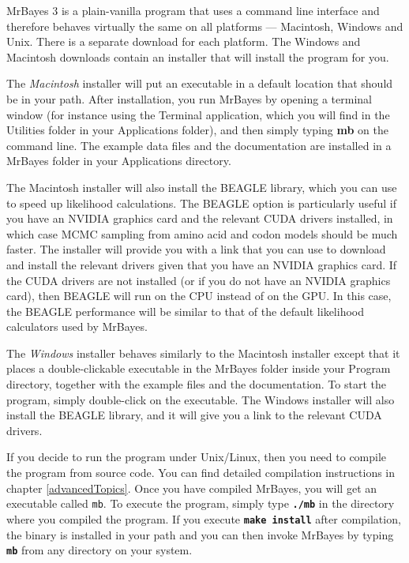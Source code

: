 \documentclass[12pt]{book}
\newcommand{\tb}[1]{\texttt{\textbf{#1}} }
\begin{document}
MrBayes 3 is a plain-vanilla program that uses a command line interface and therefore
behaves virtually the same on all platforms --- Macintosh, Windows and Unix. There is a
separate download for each platform. The Windows and Macintosh downloads contain
an installer that will install the program for you.

The \emph{Macintosh} installer will put an executable in a default location that should be in
your path. After installation, you run MrBayes by opening a terminal window (for instance using
the Terminal application, which you will find in the Utilities folder in your Applications folder),
and then simply typing \textbf{mb} on the command line. The example data files and the 
documentation are installed in a MrBayes folder in your Applications directory.

The Macintosh installer will also install the BEAGLE library, which you can use
to speed up likelihood calculations. The BEAGLE option is particularly useful if you have
an NVIDIA graphics card and the relevant CUDA drivers installed, in which case MCMC sampling
from amino acid and codon models should be much faster. The installer will provide you with a link
that you can use to download and install the relevant drivers given that you have an NVIDIA
graphics card. If the CUDA drivers are not installed (or if you do not have an NVIDIA graphics card),
then BEAGLE will run on the CPU instead of on the GPU. In this case, the
BEAGLE performance will be similar to that of the default likelihood calculators used by MrBayes.
 
The \emph{Windows} installer behaves similarly to the Macintosh installer except that it places a
double-clickable executable in the MrBayes folder inside your Program directory, together
with the example files and the documentation. To start the program, simply double-click on
the executable. The Windows installer will also install the BEAGLE library, and it will give you
a link to the relevant CUDA drivers.

If you decide to run the program under Unix/Linux, then you need to compile the
program from source code. You can find detailed compilation instructions in chapter 
\ref{advancedTopics}. Once you have compiled MrBayes, you will get an executable
called \texttt{mb}. To execute the program, simply type \tb{./mb} in the directory
where you compiled the program. If you execute \tb{make install} after compilation,
the binary is installed in your path and you can then invoke MrBayes by typing \tb{mb}
from any directory on your system.
\end{document}
